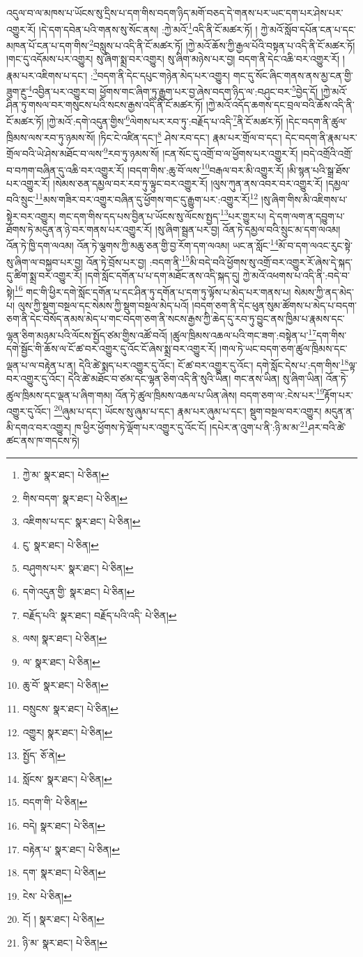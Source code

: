 འདུལ་བ་ལ་མཁས་པ་ཡོངས་སུ་དྲིས་པ་དག་གིས་བདག་ཉིད་མགོ་བཅད་དེ་གནས་པར་ཡང་དག་པར་ཤེས་པར་འགྱུར་རོ། །དེ་དག་དབེན་པའི་གནས་སུ་སོང་ནས། :ཀྱེ་མའོ་\footnote{ཀྱེ་མ་  སྣར་ཐང་།  པེ་ཅིན། }འདི་ནི་ངོ་མཚར་ཏོ། །
ཀྱེ་མའོ་སློབ་དཔོན་ངན་པ་དང་མཁན་པོ་ངན་པ་དག་གིས་\footnote{གིས་བདག་  སྣར་ཐང་།  པེ་ཅིན། }བསླུས་པ་འདི་ནི་ངོ་མཚར་ཏོ། །ཀྱེ་མའོ་ཆོས་ཀྱི་རྒྱལ་པོའི་བསྟན་པ་འདི་ནི་ངོ་མཚར་ཏོ། །གང་དུ་འདོམས་པར་འགྱུར། སུ་ཞིག་སྨྲ་བར་འགྱུར། སུ་ཞིག་མཉེས་པར་བྱ། བདག་ནི་དེང་འཆི་བར་འགྱུར་རོ། །རྣམ་པར་འཇིགས་པ་དང་། :\footnote{འཇིགས་པ་དང་  སྣར་ཐང་།  པེ་ཅིན། }བདག་ནི་དེང་དཔུང་གཉེན་མེད་པར་འགྱུར། གང་དུ་སོང་ཞིང་གནས་ནས་མྱ་ངན་གྱི་ཟུག་རྔུ་\footnote{ངུ་  སྣར་ཐང་།  པེ་ཅིན། }འབྱིན་པར་འགྱུར་བ། ཕྱོགས་གང་ཞིག་ཏུ་རྒྱུག་པར་བྱ་ཞེས་བདག་ཉིད་ལ་:བཤུང་བར་\footnote{བཤུགས་པར་  སྣར་ཐང་།  པེ་ཅིན། }བྱེད་དོ། །ཀྱེ་མའོ་ཤིན་ཏུ་གསལ་བར་གསུངས་པའི་སངས་རྒྱས་འདི་ནི་ངོ་མཚར་ཏོ། །ཀྱེ་མའོ་འདོད་ཆགས་དང་བྲལ་བའི་ཆོས་འདི་ནི་ངོ་མཚར་ཏོ། །ཀྱེ་མའོ་:དགེ་འདུན་གྱིས་\footnote{དགེ་འདུན་གྱི་  སྣར་ཐང་།  པེ་ཅིན། }ལེགས་པར་རབ་ཏུ་:བརྗོད་པ་འདི་\footnote{བརྗོད་པའི་  སྣར་ཐང་། བརྗོད་པའི་འདི་  པེ་ཅིན། }ནི་ངོ་མཚར་ཏོ། །དེང་བདག་ནི་ཚུལ་ཁྲིམས་ལས་རབ་ཏུ་ཉམས་སོ། །ཏིང་ངེ་འཛིན་དང་།\footnote{ལས།  སྣར་ཐང་།  པེ་ཅིན། } ཤེས་རབ་དང་། རྣམ་པར་གྲོལ་བ་དང་། དེང་བདག་ནི་རྣམ་པར་གྲོལ་བའི་ཡེ་ཤེས་མཐོང་བ་ལས་\footnote{ལ་  སྣར་ཐང་།  པེ་ཅིན། }རབ་ཏུ་ཉམས་སོ། །ངན་སོང་དུ་འགྲོ་བ་ལ་ཕྱོགས་པར་འགྱུར་རོ། །བདེ་འགྲོའི་འགྲོ་བ་བཀག་བཞིན་དུ་འཆི་བར་འགྱུར་རོ། །བདག་གིས་:ཆུ་བོ་ལས་\footnote{ཆུ་བོ་  སྣར་ཐང་།  པེ་ཅིན། }བརྒལ་བར་མི་འགྱུར་རོ། །མི་སྙན་པའི་སྒྲ་ཐོས་པར་འགྱུར་རོ། །སེམས་ཅན་དམྱལ་བར་རབ་ཏུ་ལྟུང་བར་འགྱུར་རོ། །ལུས་ཀུན་ནས་འབར་བར་འགྱུར་རོ། །དམྱལ་བའི་སྲུང་\footnote{བསྲུངས་  སྣར་ཐང་།  པེ་ཅིན། }མས་གཟིར་བར་འགྱུར་བཞིན་དུ་ཕྱོགས་གང་དུ་རྒྱུག་པར་:འགྱུར་རོ།\footnote{འགྱུར།  སྣར་ཐང་།  པེ་ཅིན། } །སུ་ཞིག་གིས་མི་འཇིགས་པ་སྟེར་བར་འགྱུར། གང་དག་གིས་དད་པས་བྱིན་པ་ཡོངས་སུ་ལོངས་སྤྱད་\footnote{སྤྱོད་  ཅོ་ནེ། }པར་གྱུར་པ། དེ་དག་ལག་ན་དབྱུག་པ་ཐོགས་ཏེ་མདུན་ན་ཉེ་བར་གནས་པར་འགྱུར་རོ། །སུ་ཞིག་སྦྲན་པར་བྱ། འོན་ཏེ་དམྱལ་བའི་སྲུང་མ་དག་ལའམ། འོན་ཏེ་ཁྱི་དག་ལའམ། འོན་ཏེ་ལྕགས་ཀྱི་མཆུ་ཅན་གྱི་བྱ་རོག་དག་ལའམ། ཡང་ན་སློང་\footnote{སློངས་  སྣར་ཐང་།  པེ་ཅིན། }མོ་བ་དག་ལའང་རུང་སྟེ་སུ་ཞིག་ལ་བསྐྱབ་པར་བྱ། འོན་ཏེ་བྲོས་པར་བྱ། :བདག་ནི་\footnote{བདག་གི་  པེ་ཅིན། }མི་བདེ་བའི་ཕྱོགས་སུ་འགྲོ་བར་འགྱུར་རོ་ཞེས་དེ་སྐད་དུ་ཚིག་སྨྲ་བར་འགྱུར་རོ། །དགེ་སློང་དགོན་པ་པ་དག་མཐོང་ནས་འདི་སྐད་དུ། ཀྱེ་མའོ་འཕགས་པ་འདི་ནི་:བདེ་བ་སྟེ།\footnote{བདེ།  སྣར་ཐང་།  པེ་ཅིན། } གང་གི་ཕྱིར་དགེ་སློང་དགོན་པ་དང་ཤིན་ཏུ་དགོན་པ་དག་ཏུ་ལྟོས་པ་མེད་པར་གནས་པ། སེམས་ཀྱི་ནད་མེད་པ། ལུས་ཀྱི་སྡུག་བསྔལ་དང་སེམས་ཀྱི་སྡུག་བསྔལ་མེད་པའོ། །བདག་ཅག་ནི་དེང་ཕུན་སུམ་ཚོགས་པ་མེད་པ་བདག་ཅག་ནི་དེང་བསོད་ནམས་མེད་པ་གང་བདག་ཅག་ནི་སངས་རྒྱས་ཀྱི་ཆེད་དུ་རབ་ཏུ་བྱུང་ནས་ཁྱིམ་པ་རྣམས་དང་ལྷན་ཅིག་མཉམ་པའི་ལོངས་སྤྱོད་ཙམ་གྱིས་འཚོ་བའོ། །ཚུལ་ཁྲིམས་འཆལ་པའི་གང་ཟག་:བསྟེན་པ་\footnote{བརྟེན་པ་  སྣར་ཐང་།  པེ་ཅིན། }དག་གིས་དགེ་སྦྱོང་གི་ཆོས་ལ་ངོ་ཚ་བར་འགྱུར་དུ་འོང་ངོ་ཞེས་སྨྲ་བར་འགྱུར་རོ། །གལ་ཏེ་ཡང་བདག་ཅག་ཚུལ་ཁྲིམས་དང་ལྡན་པ་ལ་བརྟེན་པ་ན། དེའི་ཚེ་སྨད་པར་འགྱུར་དུ་འོང་། ངོ་ཚ་བར་འགྱུར་དུ་འོང་། དགེ་སློང་དེས་པ་:དག་གིས་\footnote{དག་  སྣར་ཐང་།  པེ་ཅིན། }ལྟ་བར་འགྱུར་དུ་འོང་། དེའི་ཚེ་མཐོང་བ་ཙམ་དང་ལྷན་ཅིག་འདི་ནི་སུའི་ཡིན། གང་ནས་ཡིན། སུ་ཞིག་ཡིན། འོན་ཏེ་ཚུལ་ཁྲིམས་དང་ལྡན་པ་ཞིག་གམ། འོན་ཏེ་ཚུལ་ཁྲིམས་འཆལ་པ་ཡིན་ཞེས། བདག་ཅག་ལ་:ངེས་པར་\footnote{ངེས་  པེ་ཅིན། }རྟོག་པར་འགྱུར་དུ་འོང་། \footnote{ངོ། །   སྣར་ཐང་།  པེ་ཅིན། }ཞུམ་པ་དང་། ཡོངས་སུ་ཞུམ་པ་དང་། རྣམ་པར་ཞུམ་པ་དང་། སྡུག་བསྔལ་བར་འགྱུར། མདུན་ན་མི་དགའ་བར་འགྱུར། ཁ་ཕྱིར་ཕྱོགས་ཏེ་ལྡོག་པར་འགྱུར་དུ་འོང་ངོ། །དཔེར་ན་འུག་པ་ནི་:ཉི་མ་མ་\footnote{ཉི་མ་  སྣར་ཐང་།  པེ་ཅིན། }ཤར་བའི་ཚེ་ཚང་ནས་ཁ་གདངས་ཏེ། 